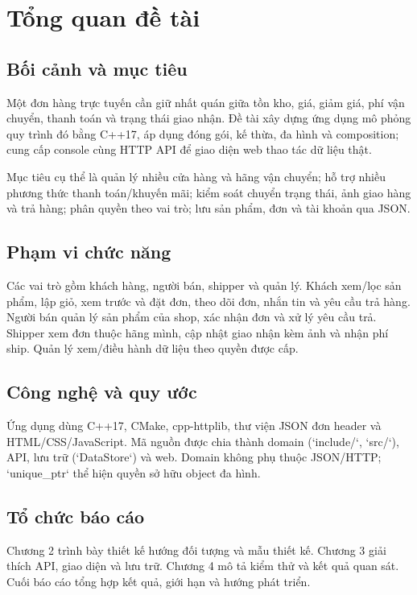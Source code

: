 \chapter{Tổng quan đề tài}
\section{Bối cảnh và mục tiêu}
Một đơn hàng trực tuyến cần giữ nhất quán giữa tồn kho, giá, giảm giá, phí vận chuyển, thanh toán và trạng thái giao nhận. Đề tài xây dựng ứng dụng mô phỏng quy trình đó bằng C++17, áp dụng đóng gói, kế thừa, đa hình và composition; cung cấp console cùng HTTP API để giao diện web thao tác dữ liệu thật.

Mục tiêu cụ thể là quản lý nhiều cửa hàng và hãng vận chuyển; hỗ trợ nhiều phương thức thanh toán/khuyến mãi; kiểm soát chuyển trạng thái, ảnh giao hàng và trả hàng; phân quyền theo vai trò; lưu sản phẩm, đơn và tài khoản qua JSON.

\section{Phạm vi chức năng}
Các vai trò gồm khách hàng, người bán, shipper và quản lý. Khách xem/lọc sản phẩm, lập giỏ, xem trước và đặt đơn, theo dõi đơn, nhắn tin và yêu cầu trả hàng. Người bán quản lý sản phẩm của shop, xác nhận đơn và xử lý yêu cầu trả. Shipper xem đơn thuộc hãng mình, cập nhật giao nhận kèm ảnh và nhận phí ship. Quản lý xem/điều hành dữ liệu theo quyền được cấp.

\section{Công nghệ và quy ước}
Ứng dụng dùng C++17, CMake, cpp-httplib, thư viện JSON đơn header và HTML/CSS/JavaScript. Mã nguồn được chia thành domain (`include/`, `src/`), API, lưu trữ (`DataStore`) và web. Domain không phụ thuộc JSON/HTTP; `unique_ptr` thể hiện quyền sở hữu object đa hình.

\section{Tổ chức báo cáo}
Chương 2 trình bày thiết kế hướng đối tượng và mẫu thiết kế. Chương 3 giải thích API, giao diện và lưu trữ. Chương 4 mô tả kiểm thử và kết quả quan sát. Cuối báo cáo tổng hợp kết quả, giới hạn và hướng phát triển.
